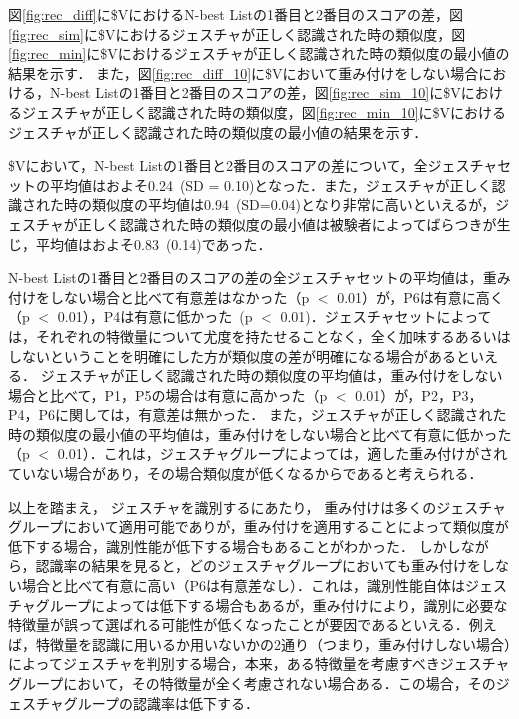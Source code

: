 図\ref{fig:rec_diff}に\$VにおけるN-best Listの1番目と2番目のスコアの差，図\ref{fig:rec_sim}に\$Vにおけるジェスチャが正しく認識された時の類似度，図\ref{fig:rec_min}に\$Vにおけるジェスチャが正しく認識された時の類似度の最小値の結果を示す．
また，図\ref{fig:rec_diff_10}に\$Vにおいて重み付けをしない場合における，N-best Listの1番目と2番目のスコアの差，図\ref{fig:rec_sim_10}に\$Vにおけるジェスチャが正しく認識された時の類似度，図\ref{fig:rec_min_10}に\$Vにおけるジェスチャが正しく認識された時の類似度の最小値の結果を示す．

\$Vにおいて，N-best Listの1番目と2番目のスコアの差について，全ジェスチャセットの平均値はおよそ0.24~(SD = 0.10)となった．また，ジェスチャが正しく認識された時の類似度の平均値は0.94~(SD=0.04)となり非常に高いといえるが，ジェスチャが正しく認識された時の類似度の最小値は被験者によってばらつきが生じ，平均値はおよそ0.83~(0.14)であった．

N-best Listの1番目と2番目のスコアの差の全ジェスチャセットの平均値は，重み付けをしない場合と比べて有意差はなかった（p $<$ 0.01）が，P6は有意に高く（p $<$ 0.01），P4は有意に低かった~(p $<$ 0.01)．ジェスチャセットによっては，それぞれの特徴量について尤度を持たせることなく，全く加味するあるいはしないということを明確にした方が類似度の差が明確になる場合があるといえる．
ジェスチャが正しく認識された時の類似度の平均値は，重み付けをしない場合と比べて，P1，P5の場合は有意に高かった（p $<$ 0.01）が，P2，P3，P4，P6に関しては，有意差は無かった．
また，ジェスチャが正しく認識された時の類似度の最小値の平均値は，重み付けをしない場合と比べて有意に低かった（p $<$ 0.01）．これは，ジェスチャグループによっては，適した重み付けがされていない場合があり，その場合類似度が低くなるからであると考えられる．

以上を踏まえ，%
ジェスチャを識別するにあたり，
重み付けは多くのジェスチャグループにおいて適用可能でありが，重み付けを適用することによって類似度が低下する場合，識別性能が低下する場合もあることがわかった．
しかしながら，認識率の結果を見ると，どのジェスチャグループにおいても重み付けをしない場合と比べて有意に高い（P6は有意差なし）．これは，識別性能自体はジェスチャグループによっては低下する場合もあるが，重み付けにより，識別に必要な特徴量が誤って選ばれる可能性が低くなったことが要因であるといえる．例えば，特徴量を認識に用いるか用いないかの2通り（つまり，重み付けしない場合）によってジェスチャを判別する場合，本来，ある特徴量を考慮すべきジェスチャグループにおいて，その特徴量が全く考慮されない場合ある．この場合，そのジェスチャグループの認識率は低下する．

